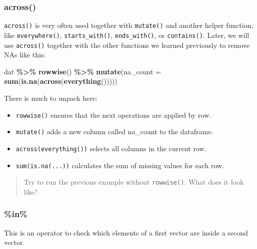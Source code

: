 \documentclass[
]{book}
\newenvironment{Shaded}{\begin{snugshade}}{\end{snugshade}}
\newcommand{\AttributeTok}[1]{\textcolor[rgb]{0.13,0.29,0.53}{#1}}
\newcommand{\FunctionTok}[1]{\textcolor[rgb]{0.13,0.29,0.53}{\textbf{#1}}}
\newcommand{\NormalTok}[1]{#1}
\newcommand{\SpecialCharTok}[1]{\textcolor[rgb]{0.81,0.36,0.00}{\textbf{#1}}}
\providecommand{\tightlist}{%
  \setlength{\itemsep}{0pt}\setlength{\parskip}{0pt}}
\begin{document}
\hypertarget{across}{%
\subsubsection{across()}\label{across}}

\texttt{across()} is very often used together with \texttt{mutate()} and another helper function, like \texttt{everywhere()}, \texttt{starts\_with()}, \texttt{ends\_with()}, or \texttt{contains()}.
Later, we will use \texttt{across()} together with the other functions we learned previously to remove NAs like this:

\begin{Shaded}
\begin{Highlighting}[]
\NormalTok{dat }\SpecialCharTok{\%\textgreater{}\%}
  \FunctionTok{rowwise}\NormalTok{() }\SpecialCharTok{\%\textgreater{}\%}
  \FunctionTok{mutate}\NormalTok{(}\AttributeTok{na\_count =} \FunctionTok{sum}\NormalTok{(}\FunctionTok{is.na}\NormalTok{(}\FunctionTok{across}\NormalTok{(}\FunctionTok{everything}\NormalTok{()))))}
\end{Highlighting}
\end{Shaded}

There is much to unpack here:

\begin{itemize}
\tightlist
\item
  \texttt{rowwise()} ensures that the next operations are applied by row.\\
\item
  \texttt{mutate()} adds a new column called na\_count to the dataframe.\\
\item
  \texttt{across(everything())} selects all columns in the current row.\\
\item
  \texttt{sum(is.na(...))} calculates the sum of missing values for each row.
\end{itemize}

\begin{quote}
Try to run the previous example without \texttt{rowwise()}. What does it look like?
\end{quote}

\hypertarget{in}{%
\subsubsection{\%in\%}\label{in}}

This is an operator to check which elements of a first vector are inside a second vector.
\end{document}
